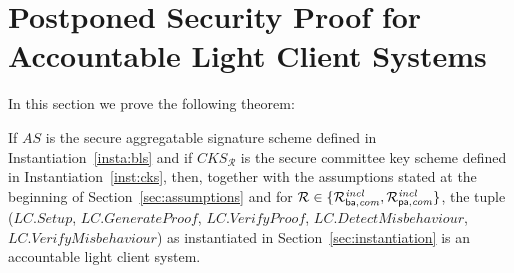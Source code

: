 \section{Postponed Security Proof for Accountable Light Client Systems}
\label{supplementary_proof_sec_accountability}

\noindent In this section we prove the following theorem:

\begin{theorem} 
\label{th:accountability_results}
If $\mathit{AS}$ is the secure aggregatable signature scheme defined in Instantiation~\ref{insta:bls} and if 
$\mathit{CKS_{\mathcal{R}}}$ is the secure committee key scheme defined in Instantiation~\ref{inst:cks}, then, together 
with the assumptions stated at the beginning of Section~\ref{sec:assumptions} and for $\mathcal{R} \in \{ \mathcal{R}^{\mathit{incl}}_{\mathsf{ba},\mathit{com}}, \mathcal{R}^{\mathit{incl}}_{\mathsf{pa},\mathit{com}} \}$, the tuple 
($\mathit{LC.Setup}$, $\mathit{LC.GenerateProof}$, $\mathit{LC.VerifyProof}$, $\mathit{LC.DetectMisbehaviour}$, 
$\mathit{LC.VerifyMisbehaviour}$) as instantiated in Section~\ref{sec:instantiation} is an accountable light client system.
\end{theorem}
